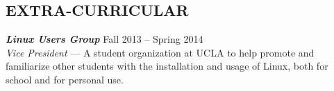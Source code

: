 \documentclass[line,letterpaper]{resume}
\begin{document}
\begin{resume}
    
    \section{\uppercase{Extra-Curricular}}
    {\sl\textbf{Linux Users Group}} \hfill Fall 2013 -- Spring 2014\\
    \emph{Vice President} --- A student organization at UCLA to help promote
	and familiarize other students with the installation and usage of Linux,
	both for school and for personal use.

\end{resume}
\end{document}
